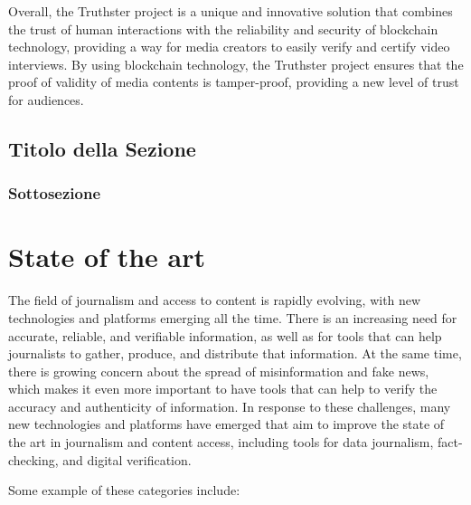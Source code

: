 \documentclass[target=mst,aauheader=]{thud}
\begin{document}
Overall, the Truthster project is a unique and innovative solution that combines the trust of human interactions with the reliability and security of blockchain technology, providing a way for media creators to easily verify and certify video interviews. By using blockchain technology, the Truthster project ensures that the proof of validity of media contents is tamper-proof, providing a new level of trust for audiences.

\section{Titolo della Sezione}

\subsection{Sottosezione}





\chapter{State of the art}

The field of journalism and access to content is rapidly evolving, with new technologies and platforms emerging all the time. There is an increasing need for accurate, reliable, and verifiable information, as well as for tools that can help journalists to gather, produce, and distribute that information. At the same time, there is growing concern about the spread of misinformation and fake news\cite{DefiningFakeNews}, which makes it even more important to have tools that can help to verify the accuracy and authenticity of information. In response to these challenges, many new technologies and platforms have emerged that aim to improve the state of the art in journalism and content access, including tools for data journalism, fact-checking, and digital verification.\par
Some example of these categories include:
\end{document}

